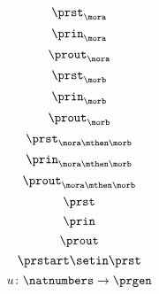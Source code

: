 {\begin{forslides}
\begin{equation}
            \prst_{\mora}
        \end{equation}
        \begin{equation}
            \label{eq:mora-prin}
            \prin_{\mora}
        \end{equation}
        \begin{equation}
            \label{eq:mora-prout}
            \prout_{\mora}
        \end{equation}
        \begin{equation}
            \label{eq:morb-prst}
            \prst_{\morb}
        \end{equation}
        \begin{equation}
            \label{eq:morb-prin}
            \prin_{\morb}
        \end{equation}
        \begin{equation}
            \label{eq:morb-prout}
            \prout_{\morb}
        \end{equation}
        \begin{equation}
            \label{eq:morab-prst}
            \prst_{\mora\mthen\morb}
        \end{equation}
        \begin{equation}
            \label{eq:morab-prin}
            \prin_{\mora\mthen\morb}
        \end{equation}
        \begin{equation}
            \label{eq:morab-prout}
            \prout_{\mora\mthen\morb}
        \end{equation}
        \begin{equation}
            \label{eq:gen-prst}
            \prst
        \end{equation}
        \begin{equation}
            \label{eq:gen-prin}
            \prin
        \end{equation}
        \begin{equation}
            \label{eq:gen-prout}
            \prout
        \end{equation}
        \begin{equation}
            \label{eq:moore-start}
            \prstart \setin \prst
        \end{equation}
        \begin{equation}
            \label{eq:prgen-u}
            u\colon \natnumbers \to \prgen

\end{equation}
\end{forslides}}
